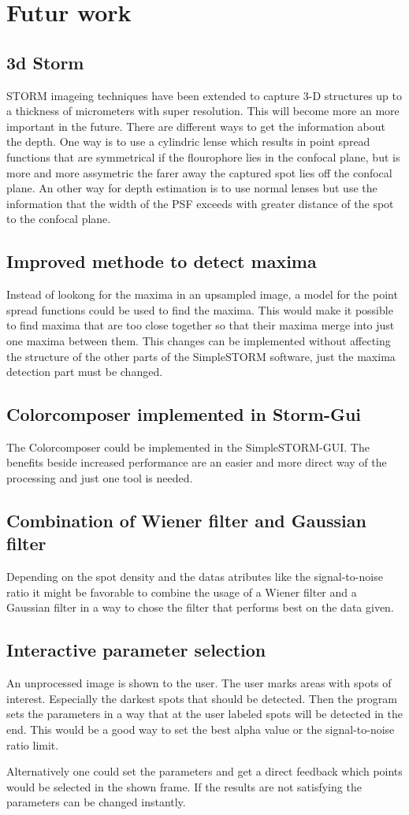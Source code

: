 \chapter{Futur work}
\section{3d Storm}
STORM imageing techniques have been extended to capture 3-D structures up to a thickness of micrometers with super resolution. This will become more an more important in the future. There are different ways to get the information about the depth. One way is to use a cylindric lense which results in point spread functions that are symmetrical if the flourophore lies in the confocal plane, but is more and more assymetric the farer away the captured spot lies off the confocal plane.\newline
An other way for depth estimation is to use normal lenses but use the information that the width of the PSF exceeds with greater distance of the spot to the confocal plane.
\section{Improved methode to detect maxima}
Instead of lookong for the maxima in an upsampled image, a model for the point spread functions could be used to find the maxima. This would make it possible to find maxima that are too close together so that their maxima merge into just one maxima between them.\newline
This changes can be implemented without affecting the structure of the other parts of the SimpleSTORM software, just the maxima detection part must be changed.
\section{Colorcomposer implemented in Storm-Gui}
The Colorcomposer could be implemented in the SimpleSTORM-GUI. The benefits beside increased performance are an easier and more direct way of the processing and just one tool is needed.
\section{Combination of Wiener filter and Gaussian filter}
Depending on the spot density and the datas atributes like the signal-to-noise ratio it might be favorable to combine the usage of a Wiener filter and a Gaussian filter in a way to chose the filter that performs best on the data given.
\section{Interactive parameter selection}
An unprocessed image is shown to the user. The user marks areas with spots of interest. Especially the darkest spots that should be detected. Then the program sets the parameters in a way that at the user labeled spots will be detected in the end. This would be a good way to set the best alpha value or the signal-to-noise ratio limit.\newline

Alternatively one could set the parameters and get a direct feedback which points would be selected in the shown frame. If the results are not satisfying the parameters can be changed instantly.